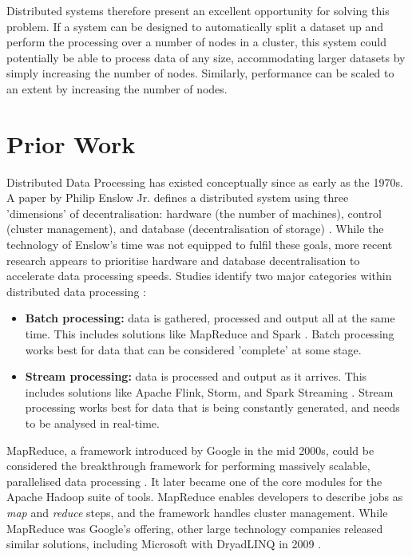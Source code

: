 Distributed systems therefore present an excellent opportunity for solving this problem. If a system can be designed to automatically split a dataset up and perform the processing over a number of nodes in a cluster, this system could potentially be able to process data of any size, accommodating larger datasets by simply increasing the number of nodes. Similarly, performance can be scaled to an extent by increasing the number of nodes.


\section{Prior Work}
Distributed Data Processing has existed conceptually since as early as the 1970s. A paper by Philip Enslow Jr{\frenchspacing.} defines a distributed system using three 'dimensions' of decentralisation: hardware (the number of machines), control (cluster management), and database (decentralisation of storage) \cite{enslow1978distributed}. While the technology of Enslow's time was not equipped to fulfil these goals, more recent research appears to prioritise hardware and database decentralisation to accelerate data processing speeds. Studies identify two major categories within distributed data processing \cite{yaqoob2016big}:
\begin{itemize}
	\item \textbf{Batch processing:} data is gathered, processed and output all at the same time. This includes solutions like MapReduce and Spark \cite{dean2008mapreduce, zaharia2016spark}. Batch processing works best for data that can be considered 'complete' at some stage.
	\item \textbf{Stream processing:} data is processed and output as it arrives. This includes solutions like Apache Flink, Storm, and Spark Streaming \cite{carbone2015flink, toshniwal2014storm, armbrust2018sparkstreaming}. Stream processing works best for data that is being constantly generated, and needs to be analysed in real-time.
\end{itemize}

MapReduce, a framework introduced by Google in the mid 2000s, could be considered the breakthrough framework for performing massively scalable, parallelised data processing \cite{dean2008mapreduce}. It later became one of the core modules for the Apache Hadoop suite of tools. MapReduce enables developers to describe jobs as \textit{map} and \textit{reduce} steps, and the framework handles cluster management. While MapReduce was Google's offering, other large technology companies released similar solutions, including Microsoft with DryadLINQ in 2009 \cite{fetterly2009dryadlinq}.

